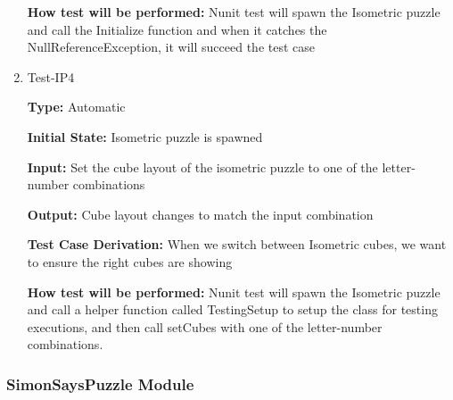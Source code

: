 \documentclass[12pt, titlepage]{article}
\begin{document}
\begin{enumerate}
\textbf{How test will be performed:} Nunit test will spawn the Isometric puzzle and call the Initialize function and when it catches the NullReferenceException, it will succeed the test case

\item{Test-IP4\\}

\textbf{Type:} Automatic
 
\textbf{Initial State:} Isometric puzzle is spawned

\textbf{Input:} Set the cube layout of the isometric puzzle to one of the letter-number combinations

\textbf{Output:} Cube layout changes to match the input combination

\textbf{Test Case Derivation:} When we switch between Isometric cubes, we want to ensure the right cubes are showing

\textbf{How test will be performed:} Nunit test will spawn the Isometric puzzle and call a helper function called TestingSetup to setup the class for testing executions, and then call setCubes with one of the letter-number combinations. 

\end{enumerate}

 \subsubsection{SimonSaysPuzzle Module}
 
\end{document}
